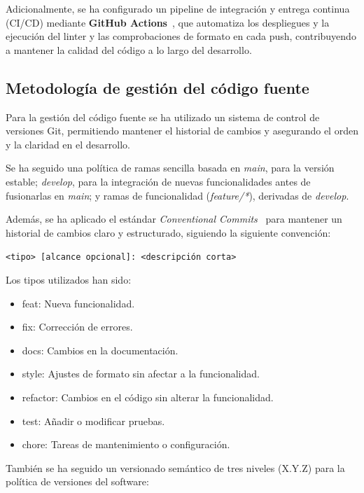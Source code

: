 Adicionalmente, se ha configurado un pipeline de integración y entrega continua (CI/CD) mediante \textbf{GitHub Actions}~\cite{githubactions}, que automatiza los despliegues y la ejecución del linter y las comprobaciones de formato en cada push, contribuyendo a mantener la calidad del código a lo largo del desarrollo.

\subsection{Metodología de gestión del código fuente}

Para la gestión del código fuente se ha utilizado un sistema de control de versiones Git, permitiendo mantener el historial de cambios y asegurando el orden y la claridad en el desarrollo.

Se ha seguido una política de ramas sencilla basada en \textit{main}, para la versión estable; \textit{develop}, para la integración de nuevas funcionalidades antes de fusionarlas en \textit{main}; y ramas de funcionalidad (\textit{feature/*}), derivadas de \textit{develop}.

Además, se ha aplicado el estándar \textit{Conventional Commits}~\cite{conventionalcommits} para mantener un historial de cambios claro y estructurado, siguiendo la siguiente convención:

\begin{center}
\texttt{<tipo> [alcance opcional]: <descripción corta>}
\end{center}

Los tipos utilizados han sido:

\begin{itemize}
    \item feat: Nueva funcionalidad.
    \item fix: Corrección de errores.
    \item docs: Cambios en la documentación.
    \item style: Ajustes de formato sin afectar a la funcionalidad.
    \item refactor: Cambios en el código sin alterar la funcionalidad.
    \item test: Añadir o modificar pruebas.
    \item chore: Tareas de mantenimiento o configuración.
\end{itemize}

También se ha seguido un versionado semántico de tres niveles (X.Y.Z) para la política de versiones del software:

